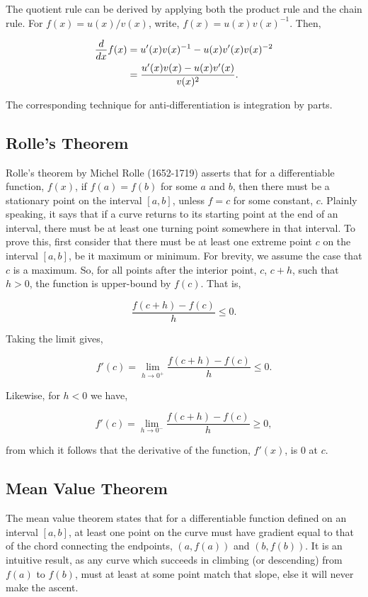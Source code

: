 \documentclass[11pt]{amsart}
\begin{document}
The quotient rule can be derived by applying both the product rule and the chain rule. For $f(x) = u(x) / v(x)$, write, $f(x) = u(x)v(x)^{-1}$. Then, 

\begin{align}
\frac{\mathop{d}}{\mathop{dx}}f(x) &= u'(x)v(x)^{-1} - u(x)v'(x)v(x)^{-2} \notag \\
&= \frac{u'(x)v(x) - u(x)v'(x)}{v(x)^2}. \notag
\end{align}

The corresponding technique for anti-differentiation is integration by parts.

\subsection{Rolle's Theorem}

Rolle's theorem by Michel Rolle (1652-1719) asserts that for a differentiable function, $f(x)$, if $f(a) = f(b)$ for some $a$ and $b$, then there must be a stationary point on the interval $[a, b]$, unless $f = c$ for some constant, $c$. Plainly speaking, it says that if a curve returns to its starting point at the end of an interval, there must be at least one turning point somewhere in that interval. To prove this, first consider that there must be at least one extreme point $c$ on the interval $[a, b]$, be it maximum or minimum. For brevity, we assume the case that $c$ is a maximum. So, for all points after the interior point, $c$, $c + h$, such that $h > 0$, the function is upper-bound by $f(c)$. That is,

$$\frac{f(c + h) - f(c)}{h} \leq 0.$$

Taking the limit gives,

$$f'(c) = \lim_{h \to 0^+} \frac{f(c + h) - f(c)}{h} \leq 0.$$

Likewise, for $h < 0$ we have,

$$f'(c) = \lim_{h \to 0^-} \frac{f(c + h) - f(c)}{h} \geq 0,$$

from which it follows that the derivative of the function, $f'(x)$, is 0 at $c$.

\subsection{Mean Value Theorem}

The mean value theorem states that for a differentiable function defined on an interval $[a, b]$, at least one point on the curve must have gradient equal to that of the chord connecting the endpoints, $(a, f(a))$ and $(b, f(b))$. It is an intuitive result, as any curve which succeeds in climbing (or descending) from $f(a)$ to $f(b)$, must at least at some point match that slope, else it will never make the ascent.
\end{document}
